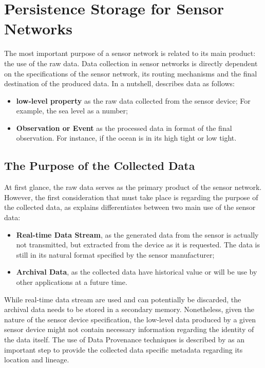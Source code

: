 \section{Persistence Storage for Sensor Networks}

The most important purpose of a sensor network is related to its main product:
the use of the raw data. Data collection in sensor networks is directly
dependent on the specifications of the sensor network, its routing mechanisms
and the final destination of the produced data. In a nutshell,
\cite{sn-storage03} describes data as follows:

\begin{itemize}
  \item \textbf{low-level property} as the raw data collected from the
  sensor device; For example, the sea level as a number;
  \item \textbf{Observation or Event} as the processed data in format of the final
  observation. For instance, if the ocean is in its high tight or low tight.
\end{itemize}

\subsection{The Purpose of the Collected Data}
\label{sec:sn-data-purpose}

At first glance, the raw data serves as the primary product of the sensor
network. However, the first consideration that must take place is regarding the
purpose of the collected data, as \cite{sn-provenance} explains
differentiates between two main use of the sensor data:

\begin{itemize}
  \item \textbf{Real-time Data Stream}, as the generated data from the sensor is
  actually not transmitted, but extracted from the device as it is requested.
  The data is still in its natural format specified by the sensor manufacturer;
  \item \textbf{Archival Data}, as the collected data have historical value or will
  be use by other applications at a future time. 
\end{itemize}

While real-time data stream are used and can potentially be discarded, the
archival data needs to be stored in a secondary memory. Nonetheless, given the
nature of the sensor device specification, the low-level data produced
by a given sensor device might not contain necessary information regarding the
identity of the data itself. The use of Data Provenance techniques is described
by \cite{sn-provenance} as an important step to provide the collected data 
specific metadata regarding its location and lineage.

